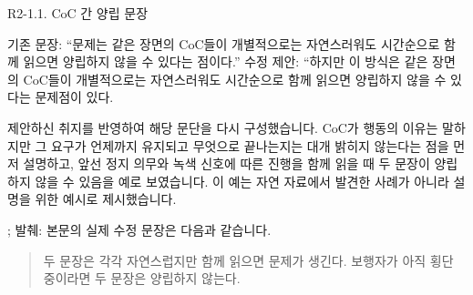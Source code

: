 




\clearpage

\begin{reviewitem}{R2-1.1. CoC 간 양립 문장}

\begin{reviewercomment}

기존 문장: ``문제는 같은 장면의 CoC들이 개별적으로는 자연스러워도 시간순으로 함께 읽으면 양립하지 않을 수 있다는 점이다.'' 수정 제안: ``하지만 이 방식은 같은 장면의 CoC들이 개별적으로는 자연스러워도 시간순으로 함께 읽으면 양립하지 않을 수 있다는 문제점이 있다.

\end{reviewercomment}

\begin{authorresponse}

제안하신 취지를 반영하여 해당 문단을 다시 구성했습니다. CoC가 행동의 이유는 말하지만 그 요구가 언제까지 유지되고 무엇으로 끝나는지는 대개 밝히지 않는다는 점을 먼저 설명하고, 앞선 정지 의무와 녹색 신호에 따른 진행을 함께 읽을 때 두 문장이 양립하지 않을 수 있음을 예로 보였습니다. 이 예는 자연 자료에서 발견한 사례가 아니라 설명을 위한 예시로 제시했습니다.

\end{authorresponse}

\begin{manuscriptrevision}{; 발췌: }
본문의 실제 수정 문장은 다음과 같습니다.

\begin{quote}
두 문장은 각각 자연스럽지만 함께 읽으면 문제가 생긴다. 보행자가 아직 횡단 중이라면 두 문장은 양립하지 않는다.
\end{quote}
\end{manuscriptrevision}

\end{reviewitem}

\clearpage

